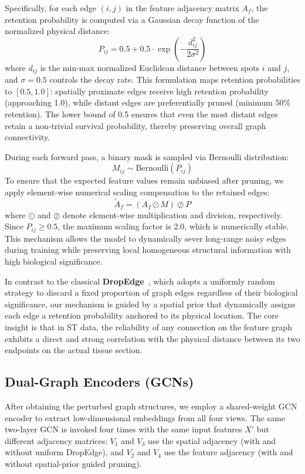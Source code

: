 \documentclass[lettersize,journal]{IEEEtran}
\begin{document}
Specifically, for each edge $(i,j)$ in the feature adjacency matrix $A_f$, the retention probability is computed via a Gaussian decay function of the normalized physical distance:
\begin{equation}
    P_{ij} = 0.5 + 0.5 \cdot \exp\left(-\frac{d_{ij}^2}{2\sigma^2}\right)
\end{equation}
where $d_{ij}$ is the min-max normalized Euclidean distance between spots $i$ and $j$, and $\sigma=0.5$ controls the decay rate. This formulation maps retention probabilities to $[0.5, 1.0]$: spatially proximate edges receive high retention probability (approaching 1.0), while distant edges are preferentially pruned (minimum 50\% retention). The lower bound of 0.5 ensures that even the most distant edges retain a non-trivial survival probability, thereby preserving overall graph connectivity.

During each forward pass, a binary mask is sampled via Bernoulli distribution:
\begin{equation}
    M_{ij} \sim \text{Bernoulli}(P_{ij})
\end{equation}
To ensure that the expected feature values remain unbiased after pruning, we apply element-wise numerical scaling compensation to the retained edges:
\begin{equation}
    \tilde{A}_f = (A_f \odot M) \oslash P
\end{equation}
where $\odot$ and $\oslash$ denote element-wise multiplication and division, respectively. Since $P_{ij} \geq 0.5$, the maximum scaling factor is 2.0, which is numerically stable. This mechanism allows the model to dynamically sever long-range noisy edges during training while preserving local homogeneous structural information with high biological significance.

In contrast to the classical \textbf{DropEdge}~\cite{rong2019dropedge}, which adopts a uniformly random strategy to discard a fixed proportion of graph edges regardless of their biological significance, our mechanism is guided by a spatial prior that dynamically assigns each edge a retention probability anchored to its physical location. The core insight is that in ST data, the reliability of any connection on the feature graph exhibits a direct and strong correlation with the physical distance between its two endpoints on the actual tissue section.

\subsection{Dual-Graph Encoders (GCNs)}
\label{sec:encoding}
After obtaining the perturbed graph structures, we employ a shared-weight GCN encoder to extract low-dimensional embeddings from all four views. The same two-layer GCN is invoked four times with the same input features $X'$ but different adjacency matrices: $V_1$ and $V_3$ use the spatial adjacency (with and without uniform DropEdge), and $V_2$ and $V_4$ use the feature adjacency (with and without spatial-prior guided pruning).
\end{document}
